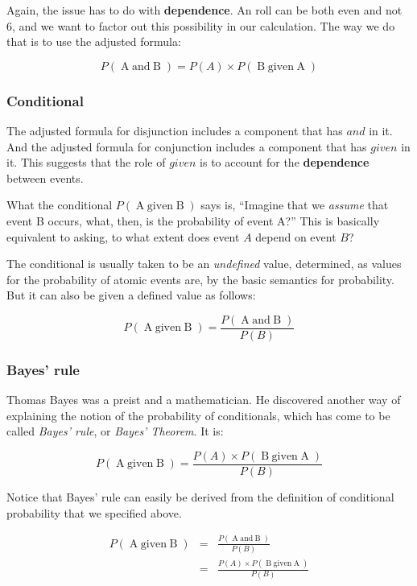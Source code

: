\documentclass[letterpaper,10pt]{article}
\newcommand\conjoin[2]{\mathop{\mbox{$#1\; and\; #2$}}}
\newcommand\given[2]{\mathop{\mbox{$#1\; given\; #2$}}}
\begin{document}
Again, the issue has to do with \textbf{dependence}.  An roll can be both even and not 6, and we want to factor out this possibility in our calculation.  The way we do that is to use the adjusted formula:

\[P(\conjoin{A}{B}) = P(A)\times P(\given{B}{A})\]

\subsubsection{Conditional}

The adjusted formula for disjunction includes a component that has $and$ in it.  And the adjusted formula for conjunction includes a component that has $given$ in it. This suggests that the role of $given$ is to account for the \textbf{dependence} between events.

What the conditional $P(\given{A}{B})$ says is, ``Imagine that we \textit{assume} that event B occurs, what, then, is the probability of event A?''  This is basically equivalent to asking, to what extent does event $A$ depend on event $B$?

The conditional is usually taken to be an \textit{undefined} value, determined, as values for the probability of atomic events are, by the basic semantics for probability.  But it can also be given a defined value as follows:

\[P(\given{A}{B}) = \frac{P(\conjoin{A}{B})}{P(B)}\]

\subsubsection{Bayes' rule}

Thomas Bayes was a preist and a mathematician.  He discovered another way of explaining the notion of the probability of conditionals, which has come to be called \textit{Bayes' rule}, or \textit{Bayes' Theorem}. It is:

\[P(\given{A}{B}) = \frac{P(A) \times P(\given{B}{A})}{P(B)}\]

Notice that Bayes' rule can easily be derived from the definition of conditional probability that we specified above. 

\[\begin{array}{ccc}
P(\given{A}{B}) & = & \frac{P(\conjoin{A}{B})}{P(B)} \\
 & = & \frac{P(A)\times P(\given{B}{A})}{P(B)} \\
\end{array}
\]
\end{document}
